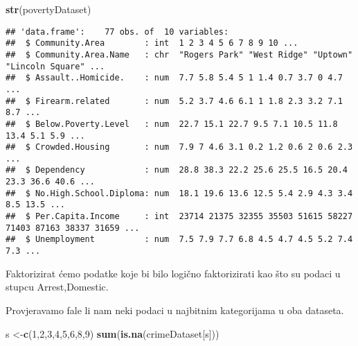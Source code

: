 \documentclass[
]{article}
\newenvironment{Shaded}{\begin{snugshade}}{\end{snugshade}}
\newcommand{\DecValTok}[1]{\textcolor[rgb]{0.00,0.00,0.81}{#1}}
\newcommand{\KeywordTok}[1]{\textcolor[rgb]{0.13,0.29,0.53}{\textbf{#1}}}
\newcommand{\NormalTok}[1]{#1}
\newcommand{\OperatorTok}[1]{\textcolor[rgb]{0.81,0.36,0.00}{\textbf{#1}}}
\newcommand{\StringTok}[1]{\textcolor[rgb]{0.31,0.60,0.02}{#1}}
\begin{document}
\begin{Shaded}
\begin{Highlighting}[]
\KeywordTok{str}\NormalTok{(povertyDataset)}
\end{Highlighting}
\end{Shaded}

\begin{verbatim}
## 'data.frame':    77 obs. of  10 variables:
##  $ Community.Area        : int  1 2 3 4 5 6 7 8 9 10 ...
##  $ Community.Area.Name   : chr  "Rogers Park" "West Ridge" "Uptown" "Lincoln Square" ...
##  $ Assault..Homicide.    : num  7.7 5.8 5.4 5 1 1.4 0.7 3.7 0 4.7 ...
##  $ Firearm.related       : num  5.2 3.7 4.6 6.1 1 1.8 2.3 3.2 7.1 8.7 ...
##  $ Below.Poverty.Level   : num  22.7 15.1 22.7 9.5 7.1 10.5 11.8 13.4 5.1 5.9 ...
##  $ Crowded.Housing       : num  7.9 7 4.6 3.1 0.2 1.2 0.6 2 0.6 2.3 ...
##  $ Dependency            : num  28.8 38.3 22.2 25.6 25.5 16.5 20.4 23.3 36.6 40.6 ...
##  $ No.High.School.Diploma: num  18.1 19.6 13.6 12.5 5.4 2.9 4.3 3.4 8.5 13.5 ...
##  $ Per.Capita.Income     : int  23714 21375 32355 35503 51615 58227 71403 87163 38337 31659 ...
##  $ Unemployment          : num  7.5 7.9 7.7 6.8 4.5 4.7 4.5 5.2 7.4 7.3 ...
\end{verbatim}

Faktorizirat ćemo podatke koje bi bilo logično faktorizirati kao što su
podaci u stupcu Arrest,Domestic.

\begin{Shaded}
\end{Shaded}

Provjeravamo fale li nam neki podaci u najbitnim kategorijama u oba
dataseta.

\begin{Shaded}
\begin{Highlighting}[]
\NormalTok{s <-}\KeywordTok{c}\NormalTok{(}\DecValTok{1}\NormalTok{,}\DecValTok{2}\NormalTok{,}\DecValTok{3}\NormalTok{,}\DecValTok{4}\NormalTok{,}\DecValTok{5}\NormalTok{,}\DecValTok{6}\NormalTok{,}\DecValTok{8}\NormalTok{,}\DecValTok{9}\NormalTok{) }
\KeywordTok{sum}\NormalTok{(}\KeywordTok{is.na}\NormalTok{(crimeDataset[s]))}
\end{Highlighting}
\end{Shaded}
\end{document}
